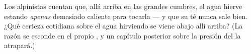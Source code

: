 \begin{exercise}[$\star\star$]\label{exo:g4:changes-of-state:11}
Los alpinistas cuentan que, allá arriba en las grandes cumbres, el
agua hierve estando \emph{apenas} demasiado caliente para tocarla ---
y que su té nunca sale bien. ¿Qué certeza cotidiana sobre el agua
hirviendo se viene abajo allí arriba? (La razón se esconde en el
propio , y un capítulo posterior sobre la presión del  la
atrapará.)
\end{exercise}
